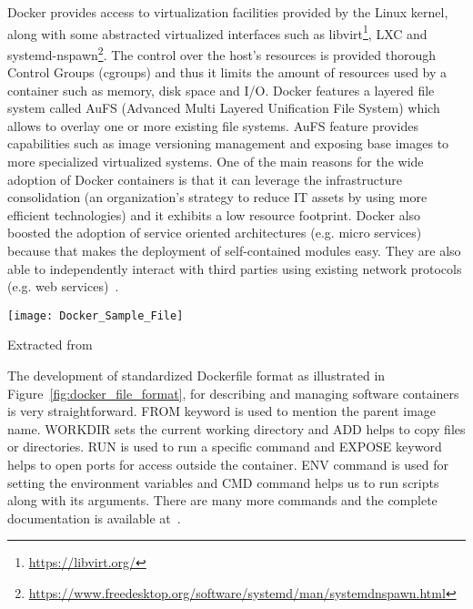 Docker provides access to virtualization facilities provided by the 
Linux kernel, along with some abstracted virtualized interfaces such as 
libvirt\footnote{\url{https://libvirt.org/}}, LXC and 
systemd-nspawn\footnote{\url{https://www.freedesktop.org/software/systemd/man/systemdnspawn.html}}. 
The control over the host's resources is provided thorough Control 
Groups (cgroups) and thus it limits the amount of resources used by a 
container such as memory, disk space and I/O. Docker features a layered 
file system called AuFS (Advanced Multi Layered Unification File 
System) which allows to overlay one or more existing file systems. AuFS 
feature provides capabilities such as image versioning management and 
exposing base images to more specialized virtualized systems. One of 
the main reasons for the wide adoption of Docker containers is that it 
can leverage the infrastructure consolidation (an organization's 
strategy to reduce IT assets by using more efficient technologies) and 
it exhibits a low resource footprint. Docker also boosted the adoption 
of service oriented architectures (e.g. micro services) because that 
makes the deployment of self-contained modules easy. They are also able 
to independently interact with third parties using existing network 
protocols (e.g. web services)~\cite{Xavier:2013:PEC:2497369.2497577}. 


\begin{center}
\texttt{[image: Docker\_Sample\_File]}
\label{fig:docker_file_format}
\caption*{Extracted from \cite{docker-file-format}}
\end{center}

The development of standardized Dockerfile format as illustrated in 
Figure~\ref{fig:docker_file_format}, for describing and managing 
software containers is very straightforward. FROM keyword is used to 
mention the parent image name. WORKDIR sets the current working 
directory and ADD helps to copy files or directories. RUN is used to 
run a specific command and EXPOSE keyword helps to open ports for 
access outside the container. ENV command is used for setting the 
environment variables and CMD command helps us to run scripts along 
with its arguments. There are many more commands and the complete 
documentation is available at~\cite{docker_commands}. 

